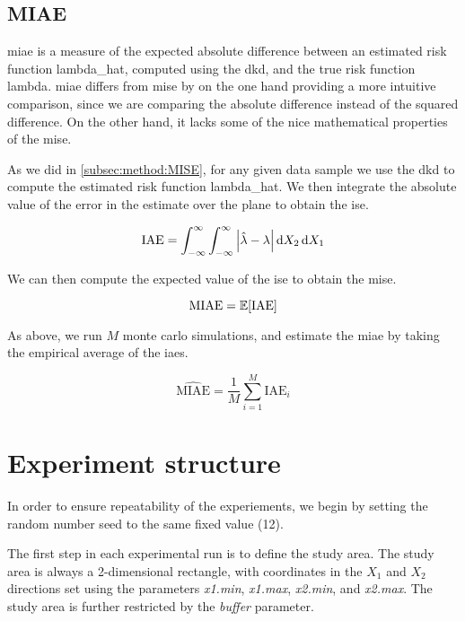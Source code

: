 \subsection{MIAE}
\label{subsec:method:MIAE}

\Gls{miae} is a measure of the expected absolute difference between an estimated risk function \gls{lambda_hat},
computed using the \gls{dkd}, and the true risk function \gls{lambda}.
\Gls{miae} differs from \gls{mise} by on the one hand providing a more intuitive comparison,
since we are comparing the absolute difference instead of the squared difference.
On the other hand, it lacks some of the nice mathematical properties of the \gls{mise}.

As we did in \autoref{subsec:method:MISE}, for any given data sample we use the \gls{dkd} to compute the estimated risk function \gls{lambda_hat}.
We then integrate the absolute value of the error in the estimate over the plane to obtain the \gls{ise}.

\begin{equation}
    \mbox{IAE} = \int_{-\infty}^{\infty} \int_{-\infty}^{\infty} \left| \hat{\lambda} - \lambda \right| \mathop{}\!\mathrm{d}{X_2} \mathop{}\!\mathrm{d}{X_1}
\end{equation}

We can then compute the expected value of the \gls{ise} to obtain the \gls{mise}.

\begin{equation}
    \mbox{MIAE} = \mathbb{E} [\mbox{IAE}]
\end{equation}

As above, we run \(M\) monte carlo simulations, and estimate the \gls{miae} by taking the empirical average of the \glspl{iae}.

\begin{equation}
    \hat{\mbox{MIAE}} = \frac{1}{M} \sum_{i=1}^{M} \mbox{IAE}_i
\end{equation}

\section{Experiment structure}
\label{sec:method:experiment_structure}

In order to ensure repeatability of the experiements, we begin by setting the random number seed to the same fixed value (12).

The first step in each experimental run is to define the study area. 
The study area is always a 2-dimensional rectangle, with coordinates in the \(X_1\) and \(X_2\) directions set using the parameters \textit{x1.min}, \textit{x1.max}, \textit{x2.min}, and \textit{x2.max}.
The study area is further restricted by the \textit{buffer} parameter.

